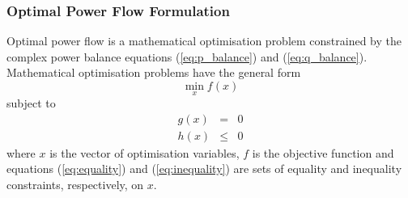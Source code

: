 
\subsubsection{Optimal Power Flow Formulation}
Optimal power flow is a mathematical optimisation problem constrained by the
complex power balance equations (\ref{eq:p_balance}) and (\ref{eq:q_balance}).
Mathematical optimisation problems have the general form
\begin{equation}
\min_x f(x)
\end{equation}
subject to
\begin{eqnarray}
\label{eq:equality}
g(x)& =& 0\\
\label{eq:inequality}
h(x)& \leq& 0
\end{eqnarray}
where $x$ is the vector of optimisation variables, $f$ is the objective
function and equations (\ref{eq:equality}) and (\ref{eq:inequality}) are sets
of equality and inequality constraints, respectively, on $x$.

